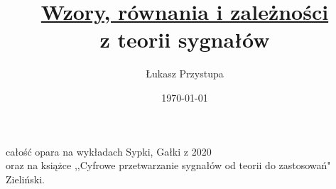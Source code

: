 \documentclass[12pt]{article}
\title{\underline{Wzory, równania i zależności}\\\textbf{z teorii sygnałów}}
\author{Łukasz Przystupa}
\date{\today}
\begin{document}
    \maketitle
    \begin{center}
        całość opara na wykładach Sypki, Gałki z 2020 \\oraz na książce ,,Cyfrowe przetwarzanie sygnałów od teorii do zastosowań" Zieliński.
    \end{center}
    \thispagestyle{empty}
    \newpage

    
\end{document}
